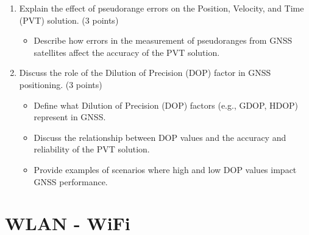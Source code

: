 \begin{questions}
\begin{enumerate}
    \item Explain the effect of pseudorange errors on the Position, Velocity, and Time (PVT) solution. (3 points)
    \begin{itemize}
        \item Describe how errors in the measurement of pseudoranges from GNSS satellites affect the accuracy of the PVT solution.
    \end{itemize}
    \item Discuss the role of the Dilution of Precision (DOP) factor in GNSS positioning. (3 points)
    \begin{itemize}
        \item Define what Dilution of Precision (DOP) factors (e.g., GDOP, HDOP) represent in GNSS.
        \item Discuss the relationship between DOP values and the accuracy and reliability of the PVT solution.
        \item Provide examples of scenarios where high and low DOP values impact GNSS performance.
    \end{itemize}
\end{enumerate}

\section{WLAN - WiFi}


\end{questions}
